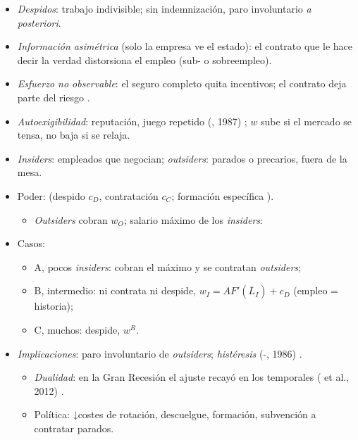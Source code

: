 \documentclass{article}
\begin{document}
\begin{columnas}
\begin{itemize}
\item \emph{Despidos}: trabajo indivisible; sin indemnización, paro involuntario \emph{a posteriori}.
\item \emph{Información asimétrica} (solo la empresa ve el estado): el contrato que le hace decir la verdad distorsiona el empleo (sub- o sobreempleo).
\item \emph{Esfuerzo no observable}: el seguro completo quita incentivos; el contrato deja parte del riesgo .
\item \emph{Autoexigibilidad}: reputación, juego repetido (, 1987) ; $w$ sube si el mercado se tensa, no baja si se relaja.
\end{itemize}
\begin{itemize}
\item \emph{Insiders}: empleados que negocian; \emph{outsiders}: parados o precarios, fuera de la mesa.
\item Poder:  (despido $c_D$, contratación $c_C$; formación específica ).
  \begin{itemize}
  \item \emph{Outsiders} cobran $w_O$; salario máximo de los \emph{insiders}:
  \end{itemize}
\item Casos:
  \begin{itemize}
  \item A, pocos \emph{insiders}: cobran el máximo y se contratan \emph{outsiders};
  \item B, intermedio: ni contrata ni despide, $w_I=AF'(\overline{L}_I)+c_D$ (empleo = historia);
  \item C, muchos: despide, $w^R$.
  \end{itemize}
\end{itemize}
\begin{itemize}
\item \emph{Implicaciones}: paro involuntario de \emph{outsiders}; \emph{histéresis} (-, 1986) .
  \begin{itemize}
  \item \emph{Dualidad}: en la Gran Recesión el ajuste recayó en los temporales ( et al., 2012) .
  \item Política: ↓costes de rotación, descuelgue, formación, subvención a contratar parados.
  \end{itemize}
\end{itemize}


\end{columnas}
\end{document}
